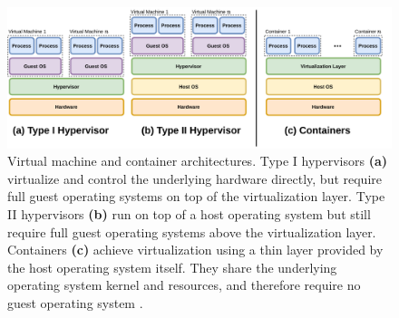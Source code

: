 \begin{figure}[htpb]
  \centering
  \includegraphics[width=0.8\linewidth]{figs/virtualization.pdf}
  \caption{
    Virtual machine and container architectures. Type I hypervisors \textbf{(a)} virtualize and control the underlying hardware directly, but require full guest operating systems on top of the virtualization layer. Type II hypervisors \textbf{(b)} run on top of a host operating system but still require full guest operating systems above the virtualization layer. Containers \textbf{(c)} achieve virtualization using a thin layer provided by the host operating system itself. They share the underlying operating system kernel and resources, and therefore require no guest operating system \cite{sultan2019_container_security}.
  }%
  \label{fig:name}
\end{figure}

